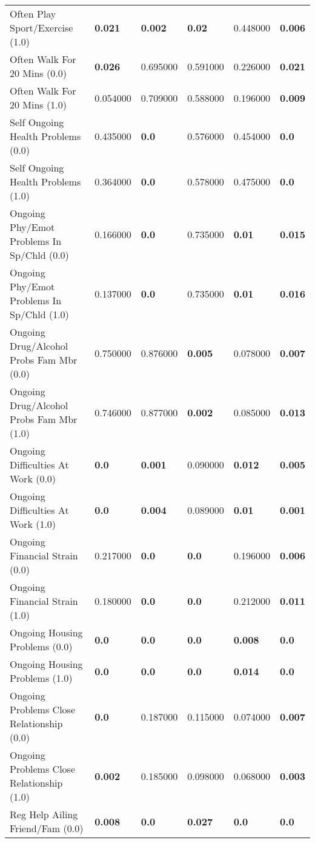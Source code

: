 \begin{tabular}{llllll}
Often Play Sport/Exercise (1.0) & \textbf{0.021} & \textbf{0.002} & \textbf{0.02} & 0.448000 & \textbf{0.006} \\
Often Walk For 20 Mins (0.0) & \textbf{0.026} & 0.695000 & 0.591000 & 0.226000 & \textbf{0.021} \\
Often Walk For 20 Mins (1.0) & 0.054000 & 0.709000 & 0.588000 & 0.196000 & \textbf{0.009} \\
Self Ongoing Health Problems (0.0) & 0.435000 & \textbf{0.0} & 0.576000 & 0.454000 & \textbf{0.0} \\
Self Ongoing Health Problems (1.0) & 0.364000 & \textbf{0.0} & 0.578000 & 0.475000 & \textbf{0.0} \\
Ongoing Phy/Emot Problems In Sp/Chld (0.0) & 0.166000 & \textbf{0.0} & 0.735000 & \textbf{0.01} & \textbf{0.015} \\
Ongoing Phy/Emot Problems In Sp/Chld (1.0) & 0.137000 & \textbf{0.0} & 0.735000 & \textbf{0.01} & \textbf{0.016} \\
Ongoing Drug/Alcohol Probs Fam Mbr (0.0) & 0.750000 & 0.876000 & \textbf{0.005} & 0.078000 & \textbf{0.007} \\
Ongoing Drug/Alcohol Probs Fam Mbr (1.0) & 0.746000 & 0.877000 & \textbf{0.002} & 0.085000 & \textbf{0.013} \\
Ongoing Difficulties At Work (0.0) & \textbf{0.0} & \textbf{0.001} & 0.090000 & \textbf{0.012} & \textbf{0.005} \\
Ongoing Difficulties At Work (1.0) & \textbf{0.0} & \textbf{0.004} & 0.089000 & \textbf{0.01} & \textbf{0.001} \\
Ongoing Financial Strain (0.0) & 0.217000 & \textbf{0.0} & \textbf{0.0} & 0.196000 & \textbf{0.006} \\
Ongoing Financial Strain (1.0) & 0.180000 & \textbf{0.0} & \textbf{0.0} & 0.212000 & \textbf{0.011} \\
Ongoing Housing Problems (0.0) & \textbf{0.0} & \textbf{0.0} & \textbf{0.0} & \textbf{0.008} & \textbf{0.0} \\
Ongoing Housing Problems (1.0) & \textbf{0.0} & \textbf{0.0} & \textbf{0.0} & \textbf{0.014} & \textbf{0.0} \\
Ongoing Problems Close Relationship (0.0) & \textbf{0.0} & 0.187000 & 0.115000 & 0.074000 & \textbf{0.007} \\
Ongoing Problems Close Relationship (1.0) & \textbf{0.002} & 0.185000 & 0.098000 & 0.068000 & \textbf{0.003} \\
Reg Help Ailing Friend/Fam (0.0) & \textbf{0.008} & \textbf{0.0} & \textbf{0.027} & \textbf{0.0} & \textbf{0.0} \\

\end{tabular}
